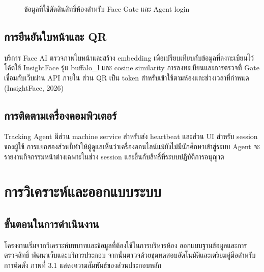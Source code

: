 \documentclass[14pt,a4paper,oneside]{extreport}
\begin{document}
\begin{figure}[htbp]\centering
{}
\caption{ข้อมูลที่ใช้ตัดสินสิทธิ์ห้องสำหรับ Face Gate และ Agent login}
\end{figure}

\section{การยืนยันใบหน้าและ QR}
บริการ Face AI ตรวจภาพใบหน้าและสร้าง embedding เพื่อเปรียบเทียบกับข้อมูลที่ลงทะเบียนไว้ โค้ดใช้ InsightFace รุ่น buffalo\_l และ cosine similarity การลงทะเบียนและการตรวจที่ Gate เชื่อมกับเว็บผ่าน API ภายใน ส่วน QR เป็น token สำหรับเข้าใช้ตามห้องและช่วงเวลาที่กำหนด (InsightFace, 2026)

\section{การติดตามเครื่องคอมพิวเตอร์}
Tracking Agent มีส่วน machine service สำหรับส่ง heartbeat และส่วน UI สำหรับ session ของผู้ใช้ การแยกสองส่วนนี้ทำให้ผู้ดูแลเห็นว่าเครื่องออนไลน์แม้ยังไม่มีนักศึกษาเข้าสู่ระบบ Agent จะรายงานกิจกรรมหน้าต่างเฉพาะในช่วง session และขึ้นกับสิทธิ์ที่ระบบปฏิบัติการอนุญาต

\chapter{การวิเคราะห์และออกแบบระบบ}
\section{ขั้นตอนในการดำเนินงาน}
โครงงานเริ่มจากวิเคราะห์บทบาทและข้อมูลที่ต้องใช้ในการบริหารห้อง ออกแบบฐานข้อมูลและการตรวจสิทธิ์ พัฒนาเว็บและบริการประกอบ จากนั้นตรวจด้วยชุดทดสอบอัตโนมัติและเตรียมคู่มือสำหรับการติดตั้ง ภาพที่ 3.1 แสดงความสัมพันธ์ของส่วนประกอบหลัก
\end{document}
